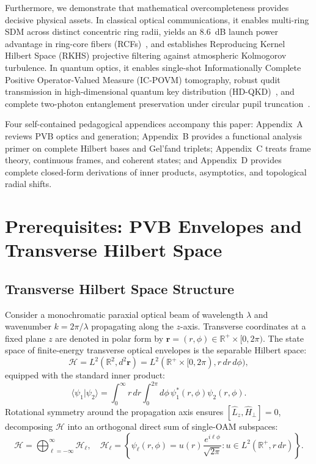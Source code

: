 \documentclass[11pt,a4paper]{article}
\begin{document}
Furthermore, we demonstrate that mathematical overcompleteness provides decisive physical assets. In classical optical communications, it enables multi-ring SDM across distinct concentric ring radii, yields an 8.6~dB launch power advantage in ring-core fibers (RCFs)~\cite{Villalba2023}, and establishes Reproducing Kernel Hilbert Space (RKHS) projective filtering against atmospheric Kolmogorov turbulence. In quantum optics, it enables single-shot Informationally Complete Positive Operator-Valued Measure (IC-POVM) tomography, robust qudit transmission in high-dimensional quantum key distribution (HD-QKD)~\cite{Cerf2002,Mirhosseini2015}, and complete two-photon entanglement preservation under circular pupil truncation~\cite{Clauser1969}.

Four self-contained pedagogical appendices accompany this paper: Appendix~A reviews PVB optics and generation; Appendix~B provides a functional analysis primer on complete Hilbert bases and Gel'fand triplets; Appendix~C treats frame theory, continuous frames, and coherent states; and Appendix~D provides complete closed-form derivations of inner products, asymptotics, and topological radial shifts.

\section{Prerequisites: PVB Envelopes and Transverse Hilbert Space}
\label{sec:prerequisites}

\subsection{Transverse Hilbert Space Structure}

Consider a monochromatic paraxial optical beam of wavelength $\lambda$ and wavenumber $k = 2\pi / \lambda$ propagating along the $z$-axis. Transverse coordinates at a fixed plane $z$ are denoted in polar form by $\mathbf{r} = (r, \phi) \in \mathbb{R}^+ \times [0, 2\pi)$. The state space of finite-energy transverse optical envelopes is the separable Hilbert space:
\begin{equation}
\mathcal{H} = L^2(\mathbb{R}^2, d^2\mathbf{r}) = L^2(\mathbb{R}^+ \times [0, 2\pi), r \, dr \, d\phi),
\end{equation}
equipped with the standard inner product:
\begin{equation}
\langle \psi_1 | \psi_2 \rangle = \int_0^\infty r \, dr \int_0^{2\pi} d\phi \, \psi_1^*(r, \phi) \psi_2(r, \phi).
\end{equation}
Rotational symmetry around the propagation axis ensures $[\hat{L}_z, \hat{H}_\perp] = 0$, decomposing $\mathcal{H}$ into an orthogonal direct sum of single-OAM subspaces:
\begin{equation}
\mathcal{H} = \bigoplus_{\ell=-\infty}^\infty \mathcal{H}_\ell, \quad \mathcal{H}_\ell = \left\{ \psi_\ell(r, \phi) = u(r) \frac{e^{i \ell \phi}}{\sqrt{2\pi}} : u \in L^2(\mathbb{R}^+, r \, dr) \right\}.
\end{equation}
\end{document}
